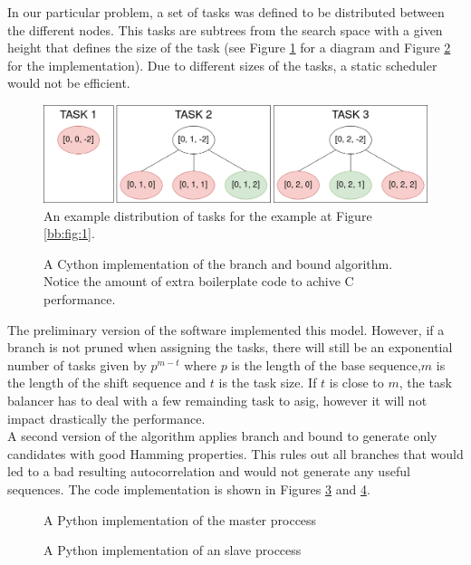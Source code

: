   In our particular problem, a set of tasks was defined to be
  distributed between the different nodes. This tasks are subtrees from the
  search space with a given height that defines the size of the task  (see Figure
  \ref{tasks:fig:1} for a diagram and Figure \ref{bb:fig:2} for the
  implementation). Due to different sizes of the tasks,  a static
  scheduler would not be efficient.\\

  \begin{figure}[ht!]
    \begin{center}
      \includegraphics[scale=0.4]{Chapters/Implementation/Example_tasks.png}
    \end{center}
    \caption{An example distribution of tasks for the example at Figure
    \ref{bb:fig:1}.}
    \label{tasks:fig:1}
  \end{figure}

  \begin{figure}[ht!]
    \caption{A Cython implementation of the branch and bound algorithm. Notice
    the amount of extra boilerplate code to achive C performance.}
    \label{bb:fig:2}
  \end{figure}


  The preliminary version of the software implemented this model.  However, if a
  branch is not pruned when assigning the tasks, there will still be an
  exponential number of tasks
  given by $p^{m-t}$ where $p$ is the length of the base sequence,$m$ is the
  length of the shift sequence  and $t$ is the task size.  If $t$ is close to $m$,
  the task balancer has to deal with a few remainding  task to asig, however it
  will not impact drastically the performance.\\

  A second version of the algorithm applies branch and bound to generate only
  candidates with good Hamming properties.
  This rules out all branches that would led to a bad resulting autocorrelation
  and would not generate any useful sequences. The code
  implementation is shown in Figures \ref{parallelism_example:fig:1} and
  \ref{parallelism_example:fig:2}.\\

  \begin{figure}[ht!]
    \caption{A Python implementation of the master proccess}
    \label{parallelism_example:fig:1}
  \end{figure}

  \begin{figure}[ht!]
    \caption{A Python implementation of an slave proccess}
    \label{parallelism_example:fig:2}
  \end{figure}
